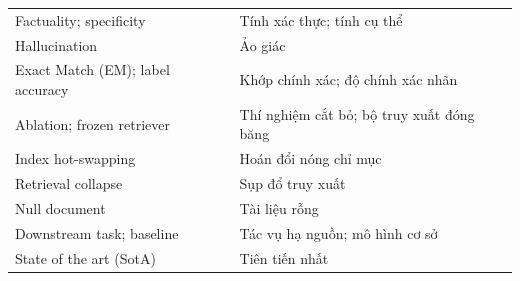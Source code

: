 \documentclass[10pt,letterpaper]{article}
\begin{document}
{\begin{tabularx}{\textwidth}{@{}>{\raggedright}p{}
    >{\raggedright\arraybackslash}X@{}}
  Factuality; specificity & Tính xác thực; tính cụ thể\\
  Hallucination & Ảo giác\\
  Exact Match (EM); label accuracy & Khớp chính xác; độ chính xác nhãn\\
  Ablation; frozen retriever & Thí nghiệm cắt bỏ; bộ truy xuất đóng băng\\
  Index hot-swapping & Hoán đổi nóng chỉ mục\\
  Retrieval collapse & Sụp đổ truy xuất\\
  Null document & Tài liệu rỗng\\
  Downstream task; baseline & Tác vụ hạ nguồn; mô hình cơ sở\\
  State of the art (SotA) & Tiên tiến nhất\\
  \bottomrule
\end{tabularx}
}
\end{document}
